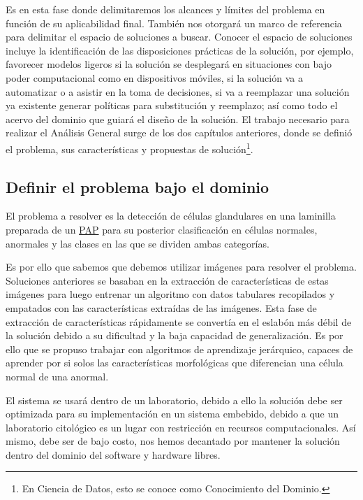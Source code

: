 Es en esta fase donde delimitaremos los alcances y límites del problema en
función de su aplicabilidad final. También nos otorgará un marco de referencia
para delimitar el espacio de soluciones a buscar. Conocer el espacio de
soluciones incluye la identificación de las disposiciones prácticas de la
solución, por ejemplo, favorecer modelos ligeros si la solución se desplegará en
situaciones con bajo poder computacional como en dispositivos móviles, si la
solución va a automatizar o a asistir en la toma de decisiones, si va a
reemplazar una solución ya existente generar políticas para substitución y
reemplazo; así como todo el acervo del dominio que guiará el diseño de la
solución. El trabajo necesario para realizar el Análisis General surge de los
dos capítulos anteriores, donde se definió el problema, sus características y
propuestas de solución\footnote{En Ciencia de Datos, esto se conoce como
Conocimiento del Dominio.}.

\subsection{Definir el problema bajo el dominio}

El problema a resolver es la detección de células glandulares en una laminilla
preparada de un \hyperlink{abbr}{PAP} para su posterior clasificación en
células normales, anormales y las clases en las que se dividen ambas categorías.

Es por ello que sabemos que debemos utilizar imágenes para resolver el problema.
Soluciones anteriores se basaban en la extracción de características de estas
imágenes para luego entrenar un algoritmo con datos tabulares recopilados y
empatados con las características extraídas de las imágenes. Esta fase de
extracción de características rápidamente se convertía en el eslabón más débil
de la solución debido a su dificultad y la baja capacidad de generalización. Es
por ello que se propuso trabajar con algoritmos de aprendizaje jerárquico,
capaces de aprender por si solos las características morfológicas que
diferencian una célula normal de una anormal.

El sistema se usará dentro de un laboratorio, debido a ello la solución debe ser
optimizada para su implementación en un sistema embebido, debido a que un
laboratorio citológico es un lugar con restricción en recursos computacionales.
Así mismo, debe ser de bajo costo, nos hemos decantado por mantener
la solución dentro del dominio del software y hardware libres.

